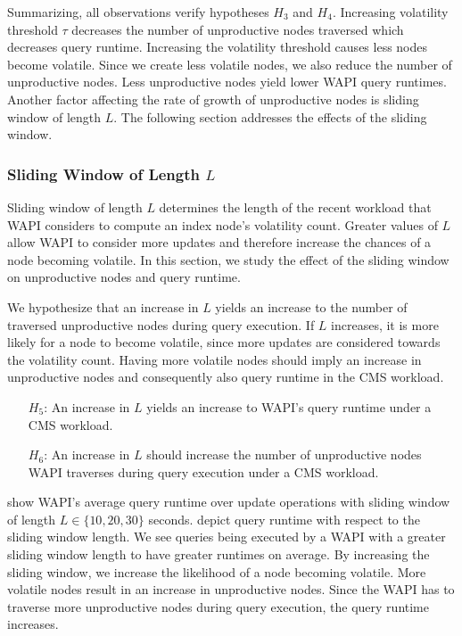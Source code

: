 \message{ !name(thesis.tex)}\documentclass[abstracton,12pt]{scrartcl}
\theoremstyle{definition}
\begin{document}
Summarizing, all observations verify hypotheses $H_3$ and $H_4$.
Increasing volatility threshold $\tau$ decreases the number of unproductive
nodes traversed which decreases query runtime. Increasing the volatility
threshold causes less nodes become volatile. Since we create less volatile
nodes, we also reduce the number of unproductive nodes. Less unproductive
nodes yield lower WAPI query runtimes. Another factor affecting the rate of
growth of unproductive nodes is sliding window of length $L$. The following
section addresses the effects of the sliding window.

\subsubsection{Sliding Window of Length $L$}

Sliding window of length $L$ determines the length of the recent workload that WAPI
considers to compute an index node's volatility count. Greater values of $L$
allow WAPI to consider more updates and therefore increase the chances of a node
becoming volatile. In this section, we study
the effect of the sliding window on unproductive nodes and query runtime.

We hypothesize that an increase in $L$ yields an increase to the number of
traversed unproductive nodes during query execution. If $L$ increases, it is
more likely for a node to become volatile, since more updates are considered
towards the volatility count.
Having more volatile nodes should imply an increase in unproductive nodes and
consequently also query runtime in the CMS workload.

\begin{shaded}
  \begin{itemize}
  \item[$H_5$:] An increase in $L$ yields an increase to WAPI's query runtime
    under a CMS workload. 
  \item[$H_6$:] An increase in $L$ should increase the number of unproductive
    nodes WAPI traverses during query execution under a CMS workload.
  \end{itemize}
\end{shaded}


 show WAPI's average
query runtime over update operations with sliding window of length $L \in \{10, 20,
30\}$ seconds.
 depict query
runtime with respect to the sliding window length. 
We see queries being executed by a WAPI with a greater sliding
window length to have greater runtimes on average. By increasing the sliding
window, we increase the likelihood of a node becoming volatile. More volatile
nodes result in an increase in unproductive nodes. Since the WAPI has to traverse
more unproductive nodes during query execution, the query runtime increases.
\end{document}
